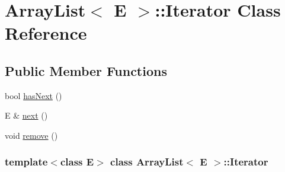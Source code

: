 \hypertarget{class_array_list_1_1_iterator}{
\section{ArrayList$<$ E $>$::Iterator Class Reference}
\label{class_array_list_1_1_iterator}
}
\subsection*{Public Member Functions}
\begin{DoxyCompactItemize}
\item 
bool \hyperlink{class_array_list_1_1_iterator_a743f313d080f3af7e01e75d5485d6873}{hasNext} ()
\item 
E \& \hyperlink{class_array_list_1_1_iterator_a0066f76bbb9c572623b1e1601c7b6f35}{next} ()
\item 
void \hyperlink{class_array_list_1_1_iterator_a6cb8e04ef41960a642fc08dfb914756f}{remove} ()
\end{DoxyCompactItemize}
\subsubsection*{template$<$class E$>$ class ArrayList$<$ E $>$::Iterator}



